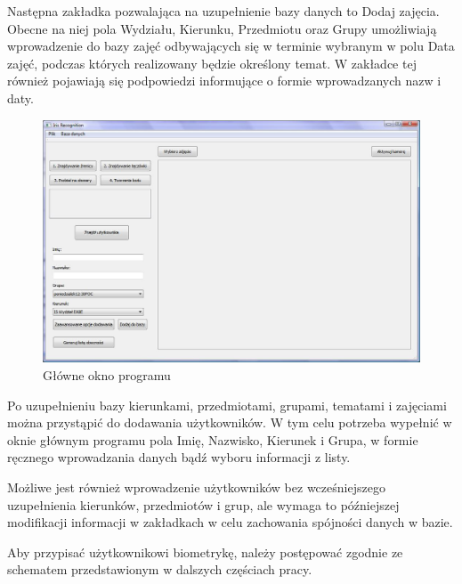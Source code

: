 Następna zakładka pozwalająca na uzupełnienie bazy danych to Dodaj zajęcia. Obecne na niej pola Wydziału, Kierunku, Przedmiotu oraz Grupy umożliwiają wprowadzenie do bazy zajęć odbywających się w terminie wybranym w polu Data zajęć, podczas których realizowany będzie określony temat. W zakładce tej również pojawiają się podpowiedzi informujące o formie wprowadzanych nazw i daty.

\begin{figure}
\begin{center}
\includegraphics[scale=0.5]{okno_glowne.jpg}
\caption{Główne okno programu}
\label{fig:oknoGlowne}
\end{center}
\end{figure}

\begin{figure}
\begin{center}
\label{fig:wybraneTabele}
\end{center}
\end{figure}

Po uzupełnieniu bazy kierunkami, przedmiotami, grupami, tematami i zajęciami można przystąpić do dodawania użytkowników. W tym celu potrzeba wypełnić w oknie głównym programu pola Imię, Nazwisko, Kierunek i Grupa, w formie ręcznego wprowadzania danych bądź wyboru informacji z listy.

Możliwe jest również wprowadzenie użytkowników bez wcześniejszego uzupełnienia kierunków, przedmiotów i grup, ale wymaga to późniejszej modifikacji informacji w zakładkach w celu zachowania spójności danych w bazie.

Aby przypisać użytkownikowi biometrykę, należy postępować zgodnie ze schematem przedstawionym w dalszych częściach pracy.

